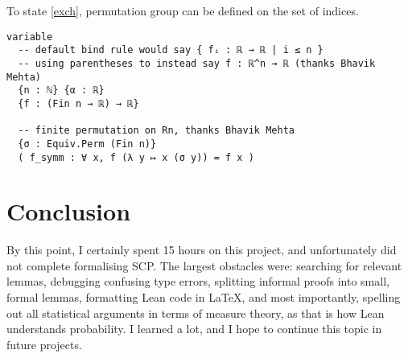 \documentclass[a4paper, 12pt]{article}
\newcommand{\R}{\mathbb{R}}
\begin{document}
To state \ref{exch},
permutation group can be defined on the set of indices.

\begin{lstlisting}
variable
  -- default bind rule would say { fᵢ : ℝ → ℝ | i ≤ n }
  -- using parentheses to instead say f : ℝ^n → ℝ (thanks Bhavik Mehta)
  {n : ℕ} {α : ℝ}
  {f : (Fin n → ℝ) → ℝ}

  -- finite permutation on Rn, thanks Bhavik Mehta
  {σ : Equiv.Perm (Fin n)}
  ( f_symm : ∀ x, f (λ y ↦ x (σ y)) = f x )
\end{lstlisting}

\section*{Conclusion}

By this point, I certainly spent 15 hours on this project,
and unfortunately did not complete formalising SCP.
The largest obstacles were:
searching for relevant lemmas,
debugging confusing type errors,
splitting informal proofs into small, formal lemmas,
formatting Lean code in LaTeX,
and most importantly,
spelling out all statistical arguments
in terms of measure theory,
as that is how Lean understands probability.
I learned a lot, and I hope to continue this topic in future projects.







\end{document}
